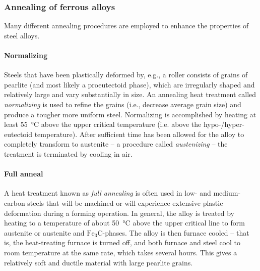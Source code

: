 \subsubsection{Annealing of ferrous alloys}
Many different annealing procedures are employed to enhance the properties of steel alloys.

\paragraph{Normalizing} Steels that have been plastically deformed by, e.g., a roller consists of grains of pearlite (and most likely a proeutectoid phase), which are irregularly shaped and relatively large and vary substantially in size. An annealing heat treatment called \textit{normalizing} is used to refine the grains (i.e., decrease average grain size) and produce a tougher more uniform steel. Normalizing is accomplished by heating at least \qty{55}{\celsius} above the upper critical temperature (i.e. above the hypo-/hyper-eutectoid temperature). After sufficient time has been allowed for the alloy to completely transform to austenite -- a procedure called \textit{austenizing} -- the treatment is terminated by cooling in air. 

\paragraph{Full anneal} A heat treatment known as \textit{full annealing} is often used in low- and medium-carbon steels that will be machined or will experience extensive plastic deformation during a forming operation. In general, the alloy is treated by heating to a temperature of about \qty{50}{\celsius} above the upper critical line to form austenite or austenite and $\mathrm{Fe}_3 \mathrm{C}$-phases. The alloy is then furnace cooled -- that is, the heat-treating furnace is turned off, and both furnace and steel cool to room temperature at the same rate, which takes several hours. This gives a relatively soft and ductile material with large pearlite grains.

